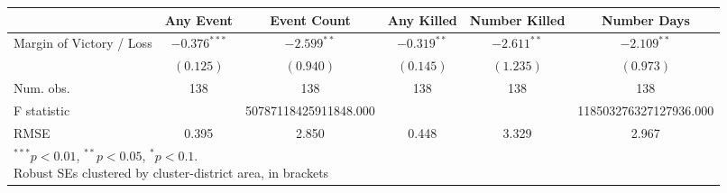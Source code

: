 
\begin{tabular}{l c c c c c }
\hline
 & Any Event & Event Count & Any Killed & Number Killed & Number Days \\
\hline
Margin of Victory / Loss & $-0.376^{***}$ & $-2.599^{**}$         & $-0.319^{**}$ & $-2.611^{**}$ & $-2.109^{**}$          \\
                         & $(0.125)$      & $(0.940)$             & $(0.145)$     & $(1.235)$     & $(0.973)$              \\
\hline
Num. obs.                & 138            & 138                   & 138           & 138           & 138                    \\
F statistic              &                & 50787118425911848.000 &               &               & 118503276327127936.000 \\
RMSE                     & 0.395          & 2.850                 & 0.448         & 3.329         & 2.967                  \\
\hline
\multicolumn{6}{l}{\scriptsize{\parbox{.4\linewidth}{\vspace{2pt}$^{***}p<0.01$, $^{**}p<0.05$, $^*p<0.1$. \\
       Robust SEs clustered by cluster-district area, in brackets\\}}}
\end{tabular}
